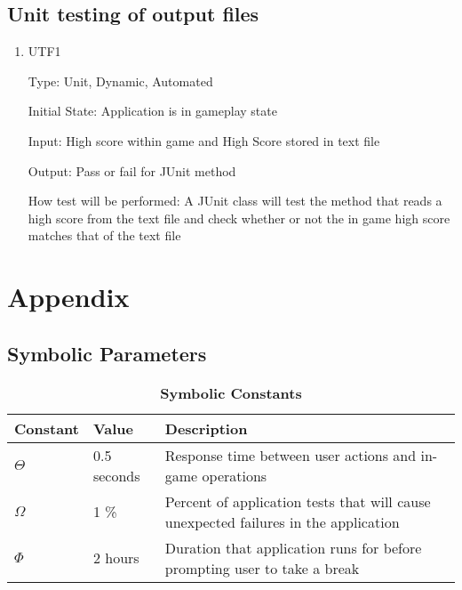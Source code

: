 \documentclass[12pt, titlepage]{article}
\begin{document}
\subsection{Unit testing of output files}	

\begin{enumerate}

\item{UTF1\\}

Type: Unit, Dynamic, Automated
					
Initial State: Application is in gameplay state
					
Input: High score within game and High Score stored in text file
					
Output: Pass or fail for JUnit method
					
How test will be performed: A JUnit class will test the method that reads a high score from the text file and check whether or not the in game high score matches that of the text file

\end{enumerate}	

%

%

\newpage

\section{Appendix}

\subsection{Symbolic Parameters}


\begin{table}[H]
\caption{\bf Symbolic Constants} \label{tab:constants}
\begin{tabularx}{\textwidth}{p{3cm}p{2cm}X}
\toprule {\bf Constant} & {\bf Value} & {\bf Description}\\
\midrule
$\Theta$ & 0.5 seconds & Response time between user actions and in-game operations\\
$\Omega$ & 1 \% & Percent of application tests that will cause unexpected failures in the application\\
$\Phi$ & 2 hours & Duration that application runs for before prompting user to take a break\\
\bottomrule
\end{tabularx}
\end{table}
\end{document}
